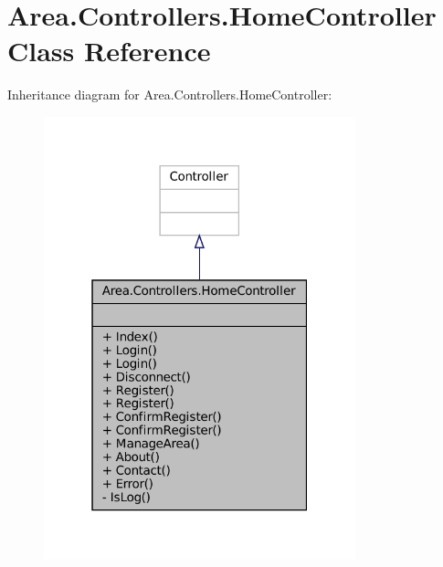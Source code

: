 \hypertarget{classArea_1_1Controllers_1_1HomeController}{}\section{Area.\+Controllers.\+Home\+Controller Class Reference}
\label{classArea_1_1Controllers_1_1HomeController}


Inheritance diagram for Area.\+Controllers.\+Home\+Controller\+:
\nopagebreak
\begin{figure}[H]
\begin{center}
\leavevmode
\includegraphics[width=256pt]{classArea_1_1Controllers_1_1HomeController__inherit__graph}
\end{center}
\end{figure}


